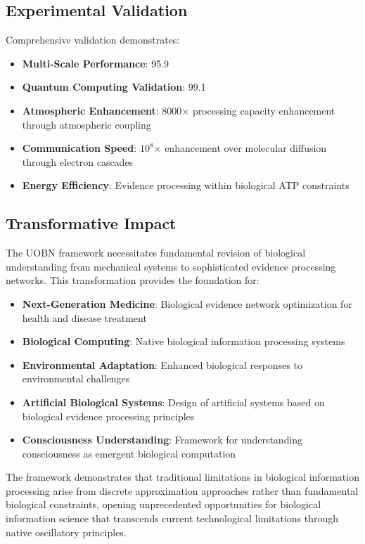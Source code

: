 \documentclass[12pt,a4paper]{article}
\begin{document}
\begin{table}[H]
\begin{table}[H]
\subsection{Experimental Validation}

Comprehensive validation demonstrates:

\begin{itemize}
\item \textbf{Multi-Scale Performance}: 95.9%
\item \textbf{Quantum Computing Validation}: 99.1%
\item \textbf{Atmospheric Enhancement}: 8000× processing capacity enhancement through atmospheric coupling
\item \textbf{Communication Speed}: $10^8$× enhancement over molecular diffusion through electron cascades
\item \textbf{Energy Efficiency}: Evidence processing within biological ATP constraints
\end{itemize}

\subsection{Transformative Impact}

The UOBN framework necessitates fundamental revision of biological understanding from mechanical systems to sophisticated evidence processing networks. This transformation provides the foundation for:

\begin{itemize}
\item \textbf{Next-Generation Medicine}: Biological evidence network optimization for health and disease treatment
\item \textbf{Biological Computing}: Native biological information processing systems
\item \textbf{Environmental Adaptation}: Enhanced biological responses to environmental challenges
\item \textbf{Artificial Biological Systems}: Design of artificial systems based on biological evidence processing principles
\item \textbf{Consciousness Understanding}: Framework for understanding consciousness as emergent biological computation
\end{itemize}

The framework demonstrates that traditional limitations in biological information processing arise from discrete approximation approaches rather than fundamental biological constraints, opening unprecedented opportunities for biological information science that transcends current technological limitations through native oscillatory principles.


\end{table}
\end{table}
\end{document}
